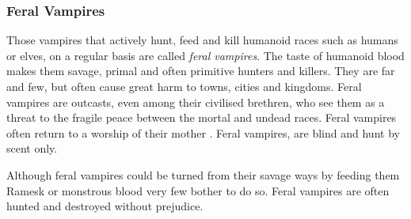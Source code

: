\subsubsection{Feral Vampires}
\label{sec:Feral Vampires}

Those vampires that actively hunt, feed and kill humanoid races such as humans
or elves, on a regular basis are called \emph{feral vampires}. The taste of
humanoid blood makes them savage, primal and often primitive hunters and
killers. They are far and few, but often cause great harm to towns, cities and
kingdoms. Feral vampires are outcasts, even among their civilised brethren,
who see them as a threat to the fragile peace between the mortal and undead
races. Feral vampires often return to a worship of their mother
. Feral vampires, are blind and hunt by scent only.

Although feral vampires could be turned from their savage ways by feeding them
Ramesk or monstrous blood very few bother to do so. Feral vampires are often
hunted and destroyed without prejudice.

